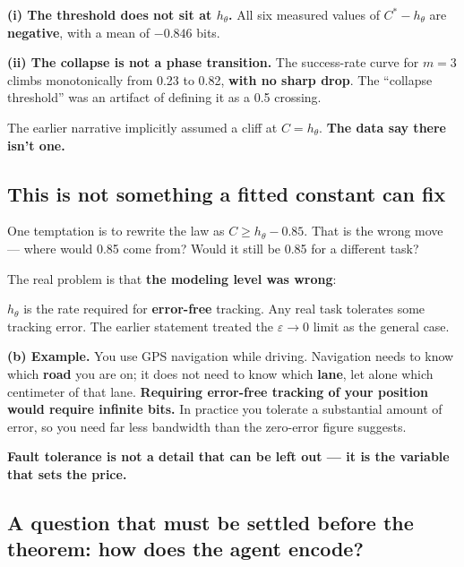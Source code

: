 \documentclass[11pt]{article}
\renewenvironment{quote}
  {\def\FrameCommand{{\color{gray!60}\vrule width 2pt}\hspace{8pt}}%
   \MakeFramed{\advance\hsize-\width \FrameRestore}\begin{itshape}}
  {\end{itshape}\endMakeFramed}
\begin{document}
\textbf{(i) The threshold does not sit at \(h_\theta\).} All six measured values of \(C^*-h_\theta\) are \textbf{negative}, with a mean of \(-0.846\) bits.

\textbf{(ii) The collapse is not a phase transition.} The success-rate curve for \(m=3\) climbs monotonically from 0.23 to 0.82, \textbf{with no sharp drop}. The ``collapse threshold'' was an artifact of defining it as a 0.5 crossing.

The earlier narrative implicitly assumed a cliff at \(C=h_\theta\). \textbf{The data say there isn't one.}

\hypertarget{this-is-not-something-a-fitted-constant-can-fix}{%
\subsection{This is not something a fitted constant can fix}\label{this-is-not-something-a-fitted-constant-can-fix}}

One temptation is to rewrite the law as \(C\ge h_\theta-0.85\). That is the wrong move --- where would 0.85 come from? Would it still be 0.85 for a different task?

The real problem is that \textbf{the modeling level was wrong}:

\begin{quote}
\(h_\theta\) is the rate required for \textbf{error-free} tracking. Any real task tolerates some tracking error. The earlier statement treated the \(\varepsilon\to0\) limit as the general case.
\end{quote}

\textbf{(b) Example.} You use GPS navigation while driving. Navigation needs to know which \textbf{road} you are on; it does not need to know which \textbf{lane}, let alone which centimeter of that lane. \textbf{Requiring error-free tracking of your position would require infinite bits.} In practice you tolerate a substantial amount of error, so you need far less bandwidth than the zero-error figure suggests.

\textbf{Fault tolerance is not a detail that can be left out --- it is the variable that sets the price.}

\hypertarget{a-question-that-must-be-settled-before-the-theorem-how-does-the-agent-encode}{%
\subsection{A question that must be settled before the theorem: how does the agent encode?}\label{a-question-that-must-be-settled-before-the-theorem-how-does-the-agent-encode}}
\end{document}
